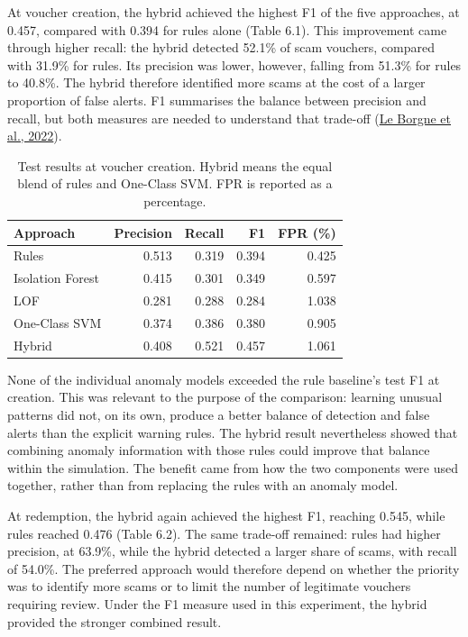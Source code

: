 \documentclass[a4paper,12pt]{article}
\begin{document}
At voucher creation, the hybrid achieved the highest F1 of the five approaches, at 0.457, compared with 0.394 for rules alone (Table 6.1). This improvement came through higher recall: the hybrid detected 52.1\% of scam vouchers, compared with 31.9\% for rules. Its precision was lower, however, falling from 51.3\% for rules to 40.8\%. The hybrid therefore identified more scams at the cost of a larger proportion of false alerts. F1 summarises the balance between precision and recall, but both measures are needed to understand that trade-off (\href{https://fraud-detection-handbook.github.io/fraud-detection-handbook/Chapter\_4\_PerformanceMetrics/ThresholdBased.html}{Le Borgne et al., 2022}).

\begin{table}[htbp]
\centering\small
\caption{Test results at voucher creation. Hybrid means the equal blend of rules and One-Class SVM. FPR is reported as a percentage.}
\begin{tabularx}{\linewidth}{Yrrrr}
\toprule
\textbf{Approach} & \textbf{Precision} & \textbf{Recall} & \textbf{F1} & \textbf{FPR (\%)} \\
\midrule
Rules & 0.513 & 0.319 & 0.394 & 0.425 \\
Isolation Forest & 0.415 & 0.301 & 0.349 & 0.597 \\
LOF & 0.281 & 0.288 & 0.284 & 1.038 \\
One-Class SVM & 0.374 & 0.386 & 0.380 & 0.905 \\
Hybrid & 0.408 & 0.521 & 0.457 & 1.061 \\
\bottomrule
\end{tabularx}
\end{table}

None of the individual anomaly models exceeded the rule baseline's test F1 at creation. This was relevant to the purpose of the comparison: learning unusual patterns did not, on its own, produce a better balance of detection and false alerts than the explicit warning rules. The hybrid result nevertheless showed that combining anomaly information with those rules could improve that balance within the simulation. The benefit came from how the two components were used together, rather than from replacing the rules with an anomaly model.

At redemption, the hybrid again achieved the highest F1, reaching 0.545, while rules reached 0.476 (Table 6.2). The same trade-off remained: rules had higher precision, at 63.9\%, while the hybrid detected a larger share of scams, with recall of 54.0\%. The preferred approach would therefore depend on whether the priority was to identify more scams or to limit the number of legitimate vouchers requiring review. Under the F1 measure used in this experiment, the hybrid provided the stronger combined result.
\end{document}
